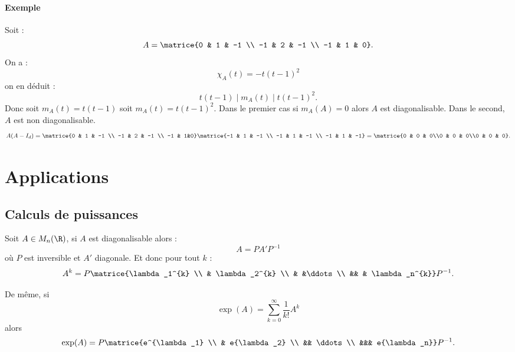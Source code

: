 \documentclass{mybourbaki}
\begin{document}
\paragraph{Exemple}Soit : \[ A = \matrice{0 & 1 & -1 \\ -1 & 2 & -1 \\ -1 & 1 & 0}.\]On a : \[ \chi_A(t) = -t(t-1)^{2}\] on en déduit : \[ t(t-1) \mid m_A(t) \mid t(t-1)^{2}.\] Donc soit $m_A(t) = t(t-1)$ soit $m_A(t) = t(t-1)^{2}$. Dans le premier cas si $m_A(A) = 0$ alors $A$ est diagonalisable. Dans le second, $A$ est non diagonalisable.
\[ A(A-I_d) = \matrice{0 & 1 & -1 \\ -1 & 2 & -1 \\ -1 & 1&0}\matrice{-1 & 1 & -1 \\ -1 & 1 & -1 \\ -1 & 1 & -1} = \matrice{0 & 0 & 0\\0 & 0 & 0\\0 & 0 & 0}.\]

\section{Applications}
\subsection{Calculs de puissances}
Soit $A\in M_n(\R)$, si $A$ est diagonalisable alors : \[ A = P A'P^{-1}\]où $P$ est inversible et $A'$ diagonale. Et donc pour tout $k$ : \[ A^{k} = P \matrice{\lambda_1^{k} \\ & \lambda_2^{k} \\
 & &\ddots \\ && & \lambda_n^{k}}P^{-1}.\]

De même, si \[ \exp(A) = \sum_{k=0}^{\infty} \frac{1}{k!}A^{k}\] alors \[ \exp(A) = P \matrice{e^{\lambda_1} \\ & e{\lambda_2} \\ && \ddots \\ &&& e{\lambda_n}}P^{-1}.\]
\end{document}
